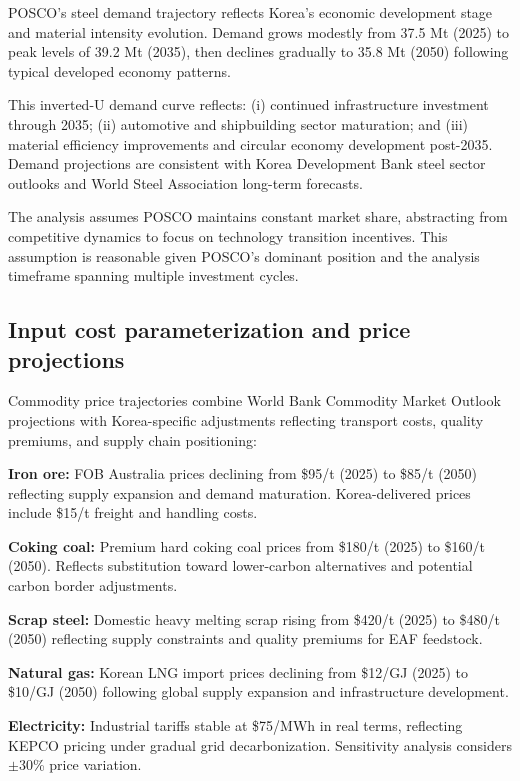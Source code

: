 \documentclass[preprint,1p,authoryear]{elsarticle}
\begin{document}
POSCO's steel demand trajectory reflects Korea's economic development stage and material intensity evolution. Demand grows modestly from 37.5 Mt (2025) to peak levels of 39.2 Mt (2035), then declines gradually to 35.8 Mt (2050) following typical developed economy patterns.

This inverted-U demand curve reflects: (i) continued infrastructure investment through 2035; (ii) automotive and shipbuilding sector maturation; and (iii) material efficiency improvements and circular economy development post-2035. Demand projections are consistent with Korea Development Bank steel sector outlooks and World Steel Association long-term forecasts.

The analysis assumes POSCO maintains constant market share, abstracting from competitive dynamics to focus on technology transition incentives. This assumption is reasonable given POSCO's dominant position and the analysis timeframe spanning multiple investment cycles.

\subsection{Input cost parameterization and price projections}

Commodity price trajectories combine World Bank Commodity Market Outlook projections with Korea-specific adjustments reflecting transport costs, quality premiums, and supply chain positioning:

\textbf{Iron ore:} FOB Australia prices declining from \$95/t (2025) to \$85/t (2050) reflecting supply expansion and demand maturation. Korea-delivered prices include \$15/t freight and handling costs.

\textbf{Coking coal:} Premium hard coking coal prices from \$180/t (2025) to \$160/t (2050). Reflects substitution toward lower-carbon alternatives and potential carbon border adjustments.

\textbf{Scrap steel:} Domestic heavy melting scrap rising from \$420/t (2025) to \$480/t (2050) reflecting supply constraints and quality premiums for EAF feedstock.

\textbf{Natural gas:} Korean LNG import prices declining from \$12/GJ (2025) to \$10/GJ (2050) following global supply expansion and infrastructure development.

\textbf{Electricity:} Industrial tariffs stable at \$75/MWh in real terms, reflecting KEPCO pricing under gradual grid decarbonization. Sensitivity analysis considers $\pm$30\% price variation.
\end{document}
